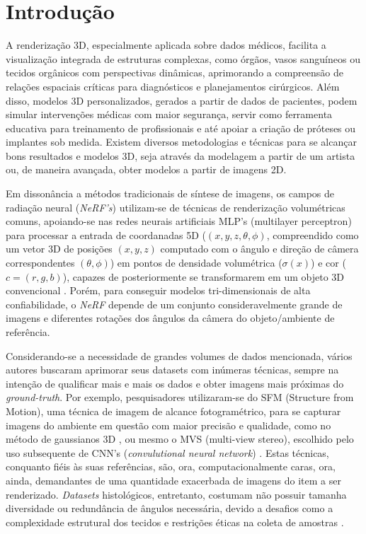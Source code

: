 \section{Introdução}
\label{sec:introducao}

A renderização 3D, especialmente aplicada sobre dados médicos, facilita a visualização integrada de estruturas complexas, como órgãos, vasos sanguíneos ou tecidos orgânicos com perspectivas dinâmicas, aprimorando a compreensão de relações espaciais críticas para diagnósticos e planejamentos cirúrgicos. Além disso, modelos 3D personalizados, gerados a partir de dados de pacientes, podem simular intervenções médicas com maior segurança, servir como ferramenta educativa para treinamento de profissionais e até apoiar a criação de próteses ou implantes sob medida. Existem diversos metodologias e técnicas para se alcançar bons resultados e modelos 3D, seja através da modelagem a partir de um artista ou, de maneira avançada, obter modelos a partir de imagens 2D. 


Em dissonância a métodos tradicionais de síntese de imagens, os campos de radiação neural (\textit{NeRF's}) utilizam-se de técnicas de renderização volumétricas comuns, apoiando-se nas redes neurais artificiais MLP's (multilayer perceptron) para processar a entrada de coordanadas 5D ($(x, y, z, \theta, \phi)$, compreendido como um vetor 3D de posições $(x, y, z)$ computado com o ângulo e direção de câmera correspondentes $(\theta, \phi)$) em pontos de densidade volumétrica ($\sigma (x)$) e cor ($c = (r, g, b)$), capazes de posteriormente se transformarem em um objeto 3D convencional \cite{mildenhall2020nerfrepresentingscenesneural}. Porém, para conseguir modelos tri-dimensionais de alta confiabilidade, o \textit{NeRF} depende de um conjunto consideravelmente grande de imagens e diferentes rotações dos ângulos da câmera do objeto/ambiente de referência.

Considerando-se a necessidade de grandes volumes de dados mencionada, vários autores buscaram aprimorar seus datasets com inúmeras técnicas, sempre na intenção de qualificar mais e mais os dados e obter imagens mais próximas do \textit{ground-truth}. Por exemplo, pesquisadores utilizaram-se do SFM  (Structure from Motion), uma técnica de imagem de alcance fotogramétrico, para se capturar imagens do ambiente em questão com maior precisão e qualidade, como no método de gaussianos 3D \cite{kerbl3Dgaussians}, ou mesmo o MVS (multi-view stereo), escolhido pelo uso subsequente de CNN's (\textit{convulutional neural network}) \cite{chen2021mvsnerffastgeneralizableradiance}. Estas técnicas, conquanto fiéis às suas referências, são, ora, computacionalmente caras, ora, ainda, demandantes de uma quantidade exacerbada de imagens do item a ser renderizado. \textit{Datasets} histológicos, entretanto, costumam não possuir tamanha diversidade ou redundância de ângulos necessária, devido a desafios como a complexidade estrutural dos tecidos e restrições éticas na coleta de amostras \cite{XUE2021101816}.

